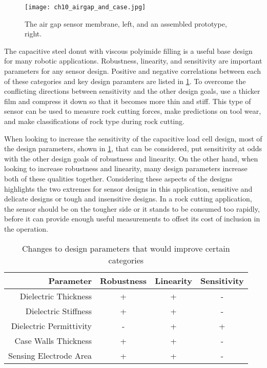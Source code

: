 \begin{figure}[ht]
\centering
\texttt{[image: ch10\_airgap\_and\_case.jpg]}
\caption{
The air gap sensor membrane, left, and an assembled prototype, right.
}
\label{fig:airgap}
\end{figure}

The capacitive steel donut with viscous polyimide filling is a useful base design
for many robotic applications. Robustness, linearity, and sensitivity are important 
parameters for any sensor design. Positive and negative correlations between each 
of these categories and key design paramters are listed in \ref{tab:improve}.
To overcome the conflicting directions between sensitivity and the other design goals,
 use a thicker film and compress it down so that it becomes more thin and stiff.
This type of sensor can be used to measure rock cutting forces, make predictions on tool wear,
and make classifications of rock type during rock cutting.

When looking to increase the sensitivity of the capacitive load cell design, 
most of the design parameters, shown in \ref{tab:improve},
that can be considered, put sensitivity at odds with the other design goals of robustness and linearity.
On the other hand, when looking to increase robustness and linearity, many design parameters 
increase both of these qualities together. Considering these aspects of the designs highlights
the two extremes for sensor designs in this application, sensitive and delicate designs or tough and insensitive designs.
In a rock cutting application, the sensor should be on the tougher side or it stands to be consumed too rapidly,
before it can provide enough useful measurements to offset its cost of inclusion in the operation.

\begin{table}[]
\centering
\caption{Changes to design parameters that would improve certain categories}
\label{tab:improve}
\begin{tabular}{|r|c|c|c|}
\hline
Parameter               & Robustness   & Linearity    & Sensitivity               \\ \hline
Dielectric Thickness    & +            & +            & -   \\ \hline
Dielectric Stiffness    & +            & +            & -   \\ \hline
Dielectric Permittivity & -            & +            & +   \\ \hline
Case Walls Thickness    & +            & +            & -   \\ \hline
Sensing Electrode Area  & +            & +            & -   \\ \hline
\end{tabular}
\end{table}

